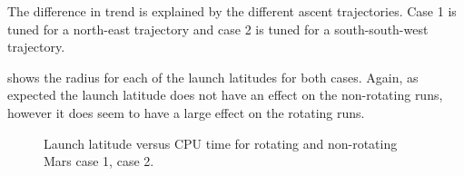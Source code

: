 The difference in trend is explained by the different ascent trajectories. Case 1 is tuned for a north-east trajectory and case 2 is tuned for a south-south-west trajectory.

 shows the radius for each of the launch latitudes for both cases. Again, as expected the launch latitude does not have an effect on the non-rotating runs, however it does seem to have a large effect on the rotating runs. 

\begin{figure}[H]
\centering
{} 
\caption{Launch latitude versus CPU time for rotating and non-rotating Mars \protect{} case 1,  \protect{} case 2. } 
\label{fig:launchLatitudeVsCPUcase1combined} 
\end{figure} 



